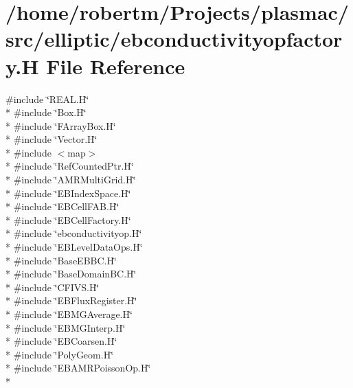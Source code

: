 \hypertarget{ebconductivityopfactory_8H}{}\section{/home/robertm/\+Projects/plasmac/src/elliptic/ebconductivityopfactory.H File Reference}
\label{ebconductivityopfactory_8H}
{\ttfamily \#include \char`\"{}R\+E\+A\+L.\+H\char`\"{}}\\*
{\ttfamily \#include \char`\"{}Box.\+H\char`\"{}}\\*
{\ttfamily \#include \char`\"{}F\+Array\+Box.\+H\char`\"{}}\\*
{\ttfamily \#include \char`\"{}Vector.\+H\char`\"{}}\\*
{\ttfamily \#include $<$map$>$}\\*
{\ttfamily \#include \char`\"{}Ref\+Counted\+Ptr.\+H\char`\"{}}\\*
{\ttfamily \#include \char`\"{}A\+M\+R\+Multi\+Grid.\+H\char`\"{}}\\*
{\ttfamily \#include \char`\"{}E\+B\+Index\+Space.\+H\char`\"{}}\\*
{\ttfamily \#include \char`\"{}E\+B\+Cell\+F\+A\+B.\+H\char`\"{}}\\*
{\ttfamily \#include \char`\"{}E\+B\+Cell\+Factory.\+H\char`\"{}}\\*
{\ttfamily \#include \char`\"{}ebconductivityop.\+H\char`\"{}}\\*
{\ttfamily \#include \char`\"{}E\+B\+Level\+Data\+Ops.\+H\char`\"{}}\\*
{\ttfamily \#include \char`\"{}Base\+E\+B\+B\+C.\+H\char`\"{}}\\*
{\ttfamily \#include \char`\"{}Base\+Domain\+B\+C.\+H\char`\"{}}\\*
{\ttfamily \#include \char`\"{}C\+F\+I\+V\+S.\+H\char`\"{}}\\*
{\ttfamily \#include \char`\"{}E\+B\+Flux\+Register.\+H\char`\"{}}\\*
{\ttfamily \#include \char`\"{}E\+B\+M\+G\+Average.\+H\char`\"{}}\\*
{\ttfamily \#include \char`\"{}E\+B\+M\+G\+Interp.\+H\char`\"{}}\\*
{\ttfamily \#include \char`\"{}E\+B\+Coarsen.\+H\char`\"{}}\\*
{\ttfamily \#include \char`\"{}Poly\+Geom.\+H\char`\"{}}\\*
{\ttfamily \#include \char`\"{}E\+B\+A\+M\+R\+Poisson\+Op.\+H\char`\"{}}\\*
